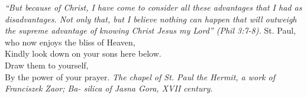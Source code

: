 \pagestyle{empty}
\hspace{0pt}
\vfill

\textit{``But because of Christ, I have come to consider all these
advantages that I had as disadvantages. Not only that, but I believe
nothing can happen that will outweigh the supreme advantage of
knowing Christ Jesus my Lord'' (Phil 3:7-8).}
\medbreak
\noindent St. Paul, who now enjoys the bliss of Heaven,\\
Kindly look down on your sons here below.\\
Draw them to yourself,\\
By the power of your prayer.
\vfill
\textit{The chapel of St. Paul the Hermit, a work of Franciszek Zaor; Ba-
silica of Jasna Gora, XVII century.}
\hspace{0pt}
\newpage
